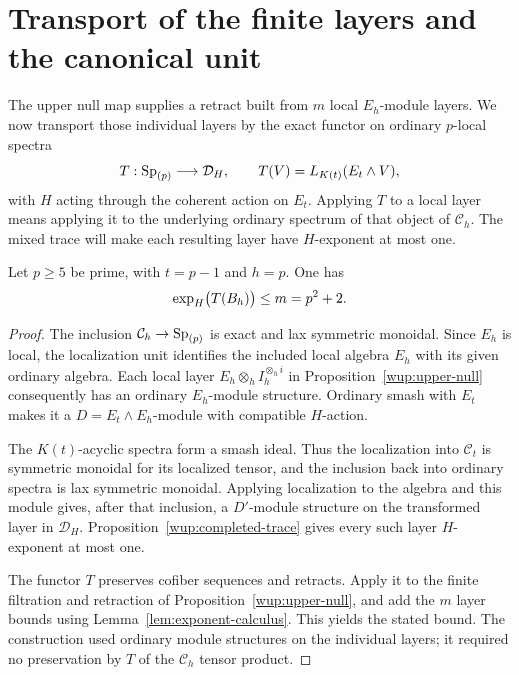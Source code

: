 \section{Transport of the finite layers and the canonical unit}
\label{sec:exponent-transport}

The upper null map supplies a retract built from $m$ local $E_h$-module
layers. We now transport those individual layers by the exact functor
on ordinary \(p\)-local spectra
\[
 T:\mathrm{Sp}_{(p)}\longrightarrow\mathcal D_H,\qquad
 T(V)=L_{K(t)}(E_t\wedge V),
\]
with \(H\) acting through the coherent action on \(E_t\).
Applying \(T\) to a local layer means applying it to the underlying
ordinary spectrum of that object of \(\mathcal C_h\). The mixed trace
will make each resulting layer have $H$-exponent at most one.

\begin{proposition}\label{wup:transfer}
Let \(p\geq5\) be prime, with \(t=p-1\) and \(h=p\). One has
\[
 \operatorname{exp}_H\bigl(T(B_h)\bigr)\leq m=p^2+2.
\]
\end{proposition}

\begin{proof}
The inclusion \(\mathcal C_h\to\mathrm{Sp}_{(p)}\) is exact and lax symmetric
monoidal. Since \(E_h\) is local, the localization unit identifies
the included local algebra \(E_h\) with its given ordinary algebra.
Each local layer
\(E_h\otimes_h I_h^{\otimes_h i}\) in
Proposition~\ref{wup:upper-null} consequently has an ordinary
\(E_h\)-module structure. Ordinary smash with \(E_t\) makes it
a \(D=E_t\wedge E_h\)-module with compatible \(H\)-action.

The \(K(t)\)-acyclic spectra form a smash ideal. Thus the
localization into \(\mathcal C_t\) is symmetric monoidal for its
localized tensor, and the inclusion back into ordinary spectra
is lax symmetric monoidal. Applying localization to the algebra
and this module gives, after that inclusion, a \(D'\)-module
structure on the transformed layer in \(\mathcal D_H\).
Proposition~\ref{wup:completed-trace} gives every such layer
\(H\)-exponent at most one.

The functor \(T\) preserves cofiber sequences and retracts.
Apply it to the finite filtration and retraction of
Proposition~\ref{wup:upper-null}, and add the \(m\) layer bounds
using Lemma~\ref{lem:exponent-calculus}. This yields the stated
bound. The construction used ordinary module structures on the
individual layers; it required no preservation by \(T\) of
the \(\mathcal C_h\) tensor product.
\end{proof}

